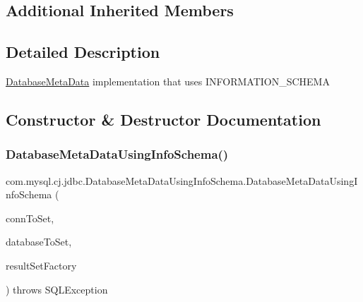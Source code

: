 \subsection*{Additional Inherited Members}


\subsection{Detailed Description}
\mbox{\hyperlink{classcom_1_1mysql_1_1cj_1_1jdbc_1_1_database_meta_data}{Database\+Meta\+Data}} implementation that uses I\+N\+F\+O\+R\+M\+A\+T\+I\+O\+N\+\_\+\+S\+C\+H\+E\+MA 

\subsection{Constructor \& Destructor Documentation}
\mbox{\label{classcom_1_1mysql_1_1cj_1_1jdbc_1_1_database_meta_data_using_info_schema_a0b688ba3bfda6e4e64a3c6374a977c52}} 
\subsubsection{\texorpdfstring{Database\+Meta\+Data\+Using\+Info\+Schema()}{DatabaseMetaDataUsingInfoSchema()}}
{\footnotesize\ttfamily com.\+mysql.\+cj.\+jdbc.\+Database\+Meta\+Data\+Using\+Info\+Schema.\+Database\+Meta\+Data\+Using\+Info\+Schema (\begin{DoxyParamCaption}\item[{\mbox{\hyperlink{interfacecom_1_1mysql_1_1cj_1_1jdbc_1_1_jdbc_connection}{Jdbc\+Connection}}}]{conn\+To\+Set,  }\item[{String}]{database\+To\+Set,  }\item[{\mbox{\hyperlink{classcom_1_1mysql_1_1cj_1_1jdbc_1_1result_1_1_result_set_factory}{Result\+Set\+Factory}}}]{result\+Set\+Factory }\end{DoxyParamCaption}) throws S\+Q\+L\+Exception\hspace{0.3cm}{\ttfamily [protected]}}



